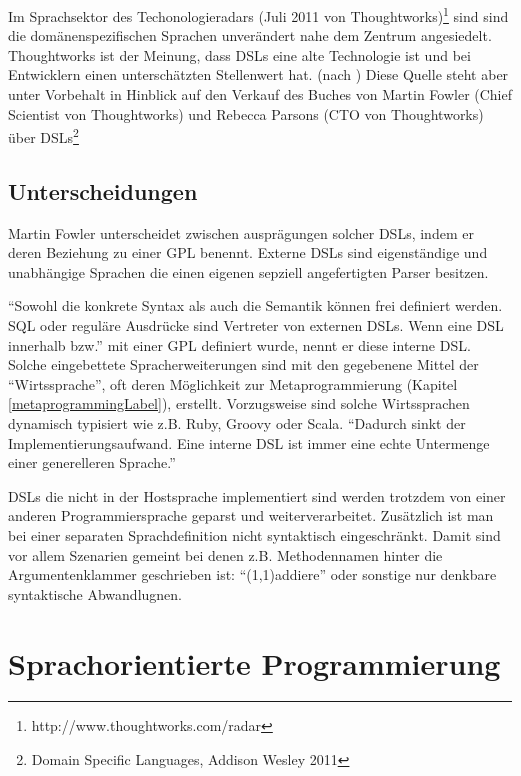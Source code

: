 \documentclass[11pt,english,ngerman, headsepline]{scrreprt}
\begin{document}

 
Im Sprachsektor des Techonologieradars (Juli 2011 von
Thoughtworks)\footnote{http://www.thoughtworks.com/radar}
sind sind die domänenspezifischen Sprachen unverändert nahe dem Zentrum
angesiedelt. Thoughtworks ist der Meinung, dass DSLs eine alte Technologie ist
und bei Entwicklern einen unterschätzten Stellenwert
hat. (nach \cite{thoughtworks-tr}) Diese Quelle steht aber unter Vorbehalt in
Hinblick auf den Verkauf des Buches von Martin Fowler (Chief Scientist von
Thoughtworks) und Rebecca Parsons (CTO von Thoughtworks) über DSLs\footnote{Domain Specific
Languages, Addison Wesley 2011} 


\subsection{Unterscheidungen}

Martin Fowler unterscheidet zwischen ausprägungen solcher DSLs, indem er deren
Beziehung zu einer GPL benennt. Externe DSLs sind eigenständige und unabhängige
Sprachen die einen eigenen sepziell angefertigten Parser besitzen. 

``Sowohl die konkrete Syntax als auch die Semantik können frei definiert
werden. SQL oder reguläre Ausdrücke sind Vertreter von externen DSLs. Wenn eine
DSL innerhalb bzw.'' \cite{wikidsl}
mit einer GPL definiert wurde, nennt er diese interne DSL. Solche eingebettete
Spracherweiterungen sind mit den gegebenene Mittel der ``Wirtssprache'', oft deren Möglichkeit zur
Metaprogrammierung (Kapitel \ref{metaprogrammingLabel}), erstellt.
Vorzugsweise sind solche Wirtssprachen dynamisch typisiert wie z.B. Ruby, Groovy
oder Scala. 
``Dadurch sinkt der Implementierungsaufwand. Eine interne DSL ist immer eine echte
Untermenge einer generelleren Sprache.'' \cite{wikidsl}

DSLs die nicht in der Hostsprache implementiert sind werden trotzdem von einer
anderen Programmiersprache geparst und weiterverarbeitet. Zusätzlich ist man bei
einer separaten Sprachdefinition nicht syntaktisch eingeschränkt. Damit sind vor
allem Szenarien gemeint bei denen z.B. Methodennamen hinter die
Argumentenklammer geschrieben ist: ``(1,1)addiere'' oder sonstige nur denkbare
syntaktische Abwandlugnen.




\section{Sprachorientierte Programmierung}
\end{document}
